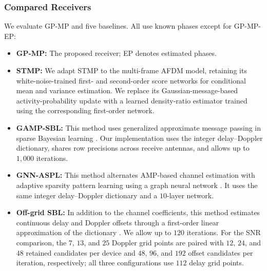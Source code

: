 \subsubsection{Compared Receivers}
\label{sec:compared-receivers}
We evaluate GP-MP and five baselines. All use known phases except
for GP-MP-EP:
\begin{itemize}[leftmargin=*,topsep=2pt,itemsep=2pt,parsep=0pt]
\item \textbf{GP-MP:} The proposed receiver; EP denotes estimated phases.
\item \textbf{STMP:} We adapt STMP \cite{cai2026} to the multi-frame
AFDM model, retaining its white-noise-trained first- and second-order
score networks for conditional mean and variance estimation. We replace
its Gaussian-message-based activity-probability update with a learned
density-ratio estimator trained using the corresponding first-order network.
\item \textbf{GAMP-SBL:} This method uses generalized approximate message
passing in sparse Bayesian learning \cite{ZhangFanHaoQuan2023GAMPSBL}.
Our implementation uses the integer delay--Doppler dictionary,
shares row precisions across receive antennas, and allows up to
$1{,}000$ iterations.
\item \textbf{GNN-ASPL:} This method alternates AMP-based channel estimation
with adaptive sparsity pattern learning using a graph neural network
\cite{ding2026}. It uses the same integer delay--Doppler dictionary and
a $10$-layer network.
\item \textbf{Off-grid SBL:} In addition to the channel coefficients,
this method estimates continuous delay and Doppler offsets through a
first-order linear approximation of the dictionary
\cite{WeiEtAl2022OffgridSBL}. We allow up to $120$ iterations.
For the SNR comparison, the $7$, $13$, and $25$ Doppler grid points
are paired with $12$, $24$, and $48$ retained candidates per device
and $48$, $96$, and $192$ offset candidates per iteration, respectively;
all three configurations use $112$ delay grid points.
\end{itemize}

